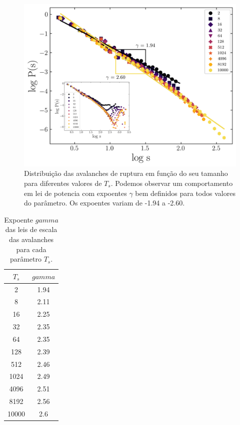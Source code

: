 \documentclass{report}
\begin{document}
        \begin{figure}[H]
            \centering
            \includegraphics[width=\textwidth]{figures/ava.png}

            \caption{Distribuição das avalanches de ruptura em função do seu tamanho para diferentes valores de \(T_{s}\).
            Podemos observar um comportamento em lei de potencia com expoentes $\gamma$ bem definidos para todos valores do 
            parâmetro. Os expoentes variam de -1.94 a -2.60.} 

            \label{R7}

        \end{figure}

        \begin{table}[H]
            \begin{tabular}{cc}
            \caption{Expoente \(gamma\) das leis de escala das avalanches para cada parâmetro \(T_{s}\).}
            \hline
            \textbf{\(T_{s}\)} & \textbf{\(gamma\)} \\ \hline
            2                  & 1.94               \\
            8                  & 2.11               \\
            16                 & 2.25               \\
            32                 & 2.35               \\
            64                 & 2.35               \\
            128                & 2.39               \\
            512                & 2.46               \\
            1024               & 2.49               \\
            4096               & 2.51               \\
            8192               & 2.56               \\
            10000              & 2.6                \\ \hline
            \end{tabular}
            \label{tab3}
        \end{table}




    
\end{document}
